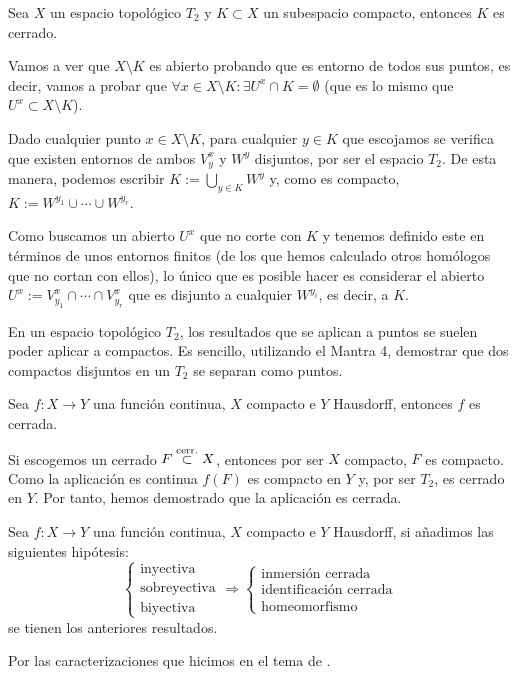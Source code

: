 \begin{prop}[Mantra 4]
Sea $X$ un espacio topológico $T_2$ y $K\subset X$ un subespacio compacto, entonces $K$ es cerrado.
\end{prop}
\begin{demo}
Vamos a ver que $X \setminus K$ es abierto probando que es entorno de todos sus puntos, es decir, vamos a probar que $\forall x\in X\setminus K : \exists U^x \cap K = \emptyset$ (que es lo mismo que $U^x \subset X\setminus K$). 

Dado cualquier punto $x\in X\setminus K$, para cualquier $y\in K$ que escojamos se verifica que existen entornos de ambos $V^x_y$ y $W^y$ disjuntos, por ser el espacio $T_2$. De esta manera, podemos escribir $K := \bigcup_{y\in K} W^y$ y, como es compacto, $K := W^{y_1} \cup \cdots \cup W^{y_r}$.

Como buscamos un abierto $U^x$ que no corte con $K$ y tenemos definido este en términos de unos entornos finitos (de los que hemos calculado otros homólogos que no cortan con ellos), lo único que es posible hacer es considerar el abierto $U^x := V^x_{y_1} \cap \cdots \cap V^{x}_{y_r}$ que es disjunto a cualquier $W^{y_i}$, es decir, a $K$.
\end{demo}

\begin{obs}
En un espacio topológico $T_2$, los resultados que se aplican a puntos se suelen poder aplicar a compactos. Es sencillo, utilizando el Mantra 4, demostrar que dos compactos disjuntos en un $T_2$ se separan como puntos.
\end{obs}

\begin{prop}
Sea $f : X \rightarrow Y$ una función continua, $X$ compacto e $Y$ Hausdorff, entonces $f$ es cerrada.
\end{prop}
\begin{demo}
Si escogemos un cerrado $F \stackrel{\text{cerr.}}{\subset} X$, entonces por ser $X$ compacto, $F$ es compacto. Como la aplicación es continua $f(F)$ es compacto en $Y$ y, por ser $T_2$, es cerrado en $Y$. Por tanto, hemos demostrado que la aplicación es cerrada.
\end{demo}

\begin{coro}
Sea $f : X \rightarrow Y$ una función continua, $X$ compacto e $Y$ Hausdorff, si añadimos las siguientes hipótesis:
\[
\begin{cases}
    \text{inyectiva}\\
    \text{sobreyectiva}\\
    \text{biyectiva}
\end{cases} \Rightarrow
\begin{cases}
    \text{inmersión cerrada}\\
    \text{identificación cerrada}\\
    \text{homeomorfismo}
\end{cases} 
\]
se tienen los anteriores resultados.
\end{coro}
\begin{demo}
Por las caracterizaciones que hicimos en el tema de .
\end{demo}

